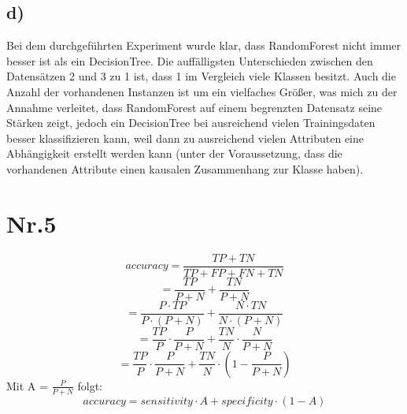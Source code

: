\documentclass[a4paper,11pt,twoside]{article}
\begin{document}
\subsection*{d)}
Bei dem durchgeführten Experiment wurde klar, dass RandomForest nicht immer besser ist als ein DecisionTree. Die auffälligsten Unterschieden zwischen den Datensätzen 2 und 3 zu 1 ist, dass 1 im Vergleich viele Klassen besitzt. Auch die Anzahl der vorhandenen Instanzen ist um ein vielfaches Größer, was mich zu der Annahme verleitet, dass RandomForest auf einem begrenzten Datensatz seine Stärken zeigt, jedoch ein DecisionTree bei ausreichend vielen Trainingsdaten besser klassifizieren kann, weil dann zu ausreichend vielen Attributen eine Abhängigkeit erstellt werden kann (unter der Voraussetzung, dass die vorhandenen Attribute einen kausalen Zusammenhang zur Klasse haben).
\section*{Nr.5}
\[accuracy = \frac{TP + TN}{TP + FP + FN + TN}\]
\[= \frac{TP}{P+N} + \frac{TN}{P+N}\]
\[= \frac{P \cdot TP}{P \cdot (P+N)} + \frac{N \cdot TN}{N \cdot (P +N)}\]
\[= \frac{TP}{P} \cdot \frac{P}{P+N} + \frac{TN}{N} \cdot \frac{N}{P+N} \]
\[= \frac{TP}{P} \cdot \frac{P}{P+N} + \frac{TN}{N} \cdot \left(1- \frac{P}{P+N}\right) \]
Mit A = $\frac{P}{P+N}$ folgt: 
\[accuracy = sensitivity \cdot A + specificity \cdot (1-A)\]
\end{document}

